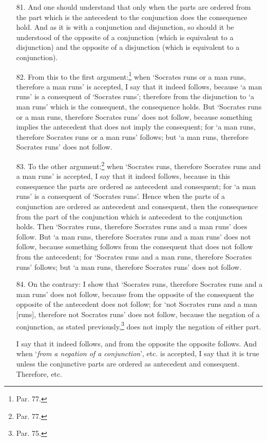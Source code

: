 \begin{enumerate}
\item[81.] And one should understand that only when the parts are ordered from the part which is the antecedent to the conjunction does the consequence hold. And as it is with a conjunction and disjunction, so should it be understood of the opposite of a conjunction (which is equivalent to a disjunction) and the opposite of a disjunction (which is equivalent to a conjunction).
\item[82.] From this to the first argument:\footnote{Par. 77.} when `Socrates runs or a man runs, therefore a man runs' is accepted, I say that it indeed follows, because `a man runs' is a consequent of `Socrates runs'; therefore from the disjunction to `a man runs' which is the consequent, the consequence holds. But `Socrates runs or a man runs, therefore Socrates runs' does not follow, because something implies the antecedent that does not imply the consequent; for `a man runs, therefore Socrates runs or a man runs' follows; but `a man runs, therefore Socrates runs' does not follow.
\item[83.] To the other argument:\footnote{Par. 77.} when `Socrates runs, therefore Socrates runs and a man runs' is accepted, I say that it indeed follows, because in this consequence the parts are ordered as antecedent and consequent; for `a man runs' is a consequent of `Socrates runs'. Hence when the parts of a conjunction are ordered as antecedent and consequent, then the consequence from the part of the conjunction which is antecedent to the conjunction holds. Then `Socrates runs, therefore Socrates runs and a man runs' does follow. But `a man runs, therefore Socrates runs and a man runs' does not follow, because something follows from the consequent that does not follow from the antecedent; for `Socrates runs and a man runs, therefore Socrates runs' follows; but `a man runs, therefore Socrates runs' does not follow.
\item[84.] On the contrary: I show that `Socrates runs, therefore Socrates runs and a man runs' does not follow, because from the opposite of the consequent the opposite of the antecedent does not follow; for `not Socrates runs and a man [runs], therefore not Socrates runs' does not follow, because the negation of a conjunction, as stated previously,\footnote{Par. 75.} does not imply the negation of either part.

I say that it indeed follows, and from the opposite the opposite follows. And when `\textit{from a negation of a conjunction}', etc. is accepted, I say that it is true unless the conjunctive parts are ordered as antecedent and consequent. Therefore, etc.
\end{enumerate}